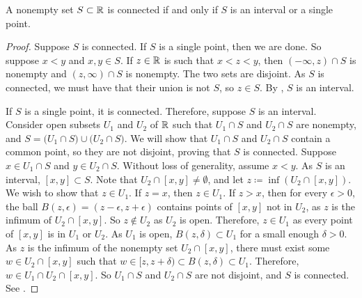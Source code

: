\begin{prop}
A nonempty set $S \subset {\mathbb{R}}$ is connected if and only if $S$ is
an interval or a single point.
\end{prop}

\begin{proof}
Suppose $S$ is connected.  If $S$ is a single point,
then we are done.  So suppose $x < y$ and $x,y \in S$.  If $z \in {\mathbb{R}}$ is such
that $x < z < y$, then $(-\infty,z) \cap S$ is nonempty and $(z,\infty) \cap
S$ is nonempty.  The two sets are disjoint.  As
$S$ is connected, we must have that their union is not $S$, so $z \in S$.
By , $S$ is an interval.

If $S$ is a single point, it is connected.
Therefore, suppose $S$ is an interval.
Consider open subsets $U_1$ and $U_2$ of ${\mathbb{R}}$ such that
$U_1 \cap S$ and $U_2 \cap S$ are nonempty, and
$S = 
\bigl( U_1 \cap S \bigr)
\cup
\bigl( U_2 \cap S \bigr)$.  We will show that $U_1 \cap S$
and $U_2 \cap S$ contain a common point, so they are not disjoint,
proving that $S$ is connected.
Suppose $x \in U_1 \cap S$
and $y \in U_2 \cap S$.  Without loss of generality, assume $x < y$.
As $S$ is an interval, $[x,y] \subset S$.
Note that $U_2 \cap [x,y] \neq \emptyset$, and
let $z \coloneqq \inf (U_2 \cap [x,y])$.
We wish to show that $z \in U_1$.
If $z = x$, then $z \in U_1$.
If $z > x$,
then for every $\epsilon > 0$, the ball $B(z,\epsilon) =
(z-\epsilon,z+\epsilon)$ contains points of $[x,y]$ not in $U_2$,
as $z$ is the infimum of $U_2 \cap [x,y]$.
So $z \notin U_2$ as $U_2$ is open.
Therefore, $z \in U_1$ as every point of $[x,y]$ is in
$U_1$ or $U_2$.
As $U_1$ is open,
$B(z,\delta) \subset U_1$ for a small enough $\delta > 0$.
As $z$ is the infimum of the nonempty set $U_2 \cap [x,y]$, 
there must exist some $w \in U_2 \cap [x,y]$
such that $w \in [z,z+\delta) \subset B(z,\delta) \subset U_1$.
Therefore, $w \in U_1 \cap U_2 \cap [x,y]$.
So $U_1 \cap S$ and $U_2 \cap S$ are not disjoint, and
$S$ is connected.
See .
\end{proof}

\begin{myfigureht}
\caption{Proof that an interval is connected.\label{fig:intervalcon}}
\end{myfigureht}

